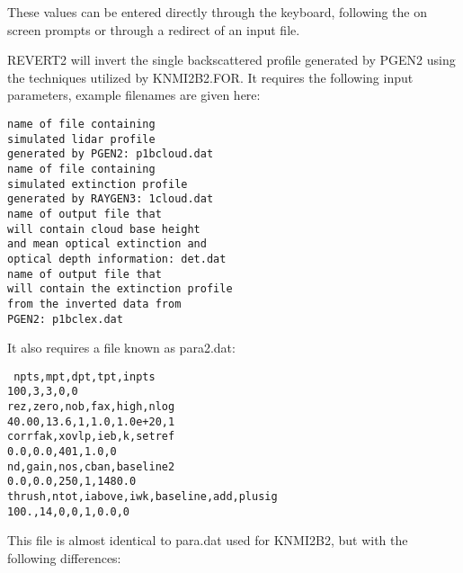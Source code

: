 \noindent
These values can be entered directly through the keyboard,
following the on screen prompts or through a redirect of an
input file.

REVERT2 will invert the single backscattered profile generated by
PGEN2 using the techniques utilized by KNMI2B2.FOR.
It requires the following input parameters, example filenames
are given here:


\noindent
{\tt name of file containing\\ 
simulated lidar profile\\
generated by PGEN2:	 	p1bcloud.dat\\
name of file containing\\
simulated extinction profile\\
generated by RAYGEN3:		 1cloud.dat\\
name of output file that\\
will contain cloud base height\\
and mean optical extinction and\\
optical depth information:	det.dat\\
name of output file that\\
will contain the extinction profile\\
from the inverted data from\\
PGEN2:				p1bclex.dat\\
}


\noindent
It also requires a file known as para2.dat: 


\noindent
{\tt
npts,mpt,dpt,tpt,inpts\\
100,3,3,0,0\\
rez,zero,nob,fax,high,nlog\\
40.00,13.6,1,1.0,1.0e+20,1\\
corrfak,xovlp,ieb,k,setref\\
0.0,0.0,401,1.0,0\\
nd,gain,nos,cban,baseline2\\
0.0,0.0,250,1,1480.0\\
thrush,ntot,iabove,iwk,baseline,add,plusig\\
100.,14,0,0,1,0.0,0\\
}

\noindent
This file is almost identical to para.dat used for
KNMI2B2, but with the following differences:


